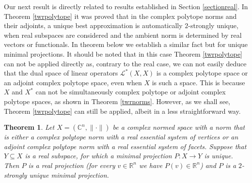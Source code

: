 \documentclass[12pt, reqno]{amsart}
\newtheorem{twr}{Theorem}[section]
\theoremstyle{definition}
\theoremstyle{remark}
\numberwithin{equation}{section}
\begin{document}
Our next result is directly related to results established in Section \ref{sectionreal}. In Theorem \ref{twrpolytope} it was proved that in the complex polytope norms and their adjoints, a unique best approximation is automatically $2$-strongly unique, when real subspaces are considered and the ambient norm is determined by real vectors or functionals. In theorem below we establish a similar fact but for unique minimal projections. It should be noted that in this case Theorem \ref{twrpolytope} can not be applied directly as, contrary to the real case, we can not easily deduce that the dual space of linear operators $\mathcal{L}^*(X, X)$ is a complex polytope space or an adjoint complex polytope space, even when $X$ is such a space. This is because $X$ and $X^*$ can not be simultaneously complex polytope or adjoint complex polytope spaces, as shown in Theorem \ref{twrnorms}. However, as we shall see, Theorem \ref{twrpolytope} can still be applied, albeit in a less straightforward way.

\begin{twr}
\label{twrprojreal}
Let $X=(\mathbb{C}^n, \| \cdot \|)$ be a complex normed space with a norm that is either a complex polytope norm with a real essential system of vertices or an adjoint complex polytope norm with a real essential system of facets. Suppose that $Y \subseteq X$ is a real subspace, for which a minimal projection $P: X \to Y$ is unique. Then $P$ is a real projection (for every $v \in \mathbb{R}^n$ we have $P(v) \in \mathbb{R}^n$) and $P$ is a $2$-strongly unique minimal projection. 
\end{twr}
\end{document}
